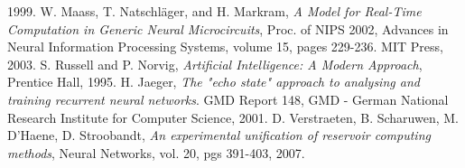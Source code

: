 \documentclass[12pt]{article}
\begin{document}
\begin{thebibliography}{widest-label}
 1999.
 W. Maass, T. Natschl\"ager, and H. Markram,
 \emph{A Model for Real-Time Computation in Generic Neural Microcircuits},
 Proc. of NIPS 2002, 
 Advances in Neural Information Processing Systems, 
 volume 15, 
 pages 229-236. 
 MIT Press, 
 2003.
 S. Russell and P. Norvig,
 \emph{Artificial Intelligence: A Modern Approach},
 Prentice Hall,
 1995.
  H. Jaeger,
  \emph{The "echo state" approach to analysing and training recurrent neural networks}. 
  GMD Report 148, 
  GMD - German National Research Institute for Computer Science,
  2001.
 D. Verstraeten, B. Scharuwen, M. D'Haene, D. Stroobandt,
 \emph{An experimental unification of reservoir computing methods},
 Neural Networks,
 vol. 20,
 pgs 391-403,
 2007.
\end{thebibliography}
\end{document}
